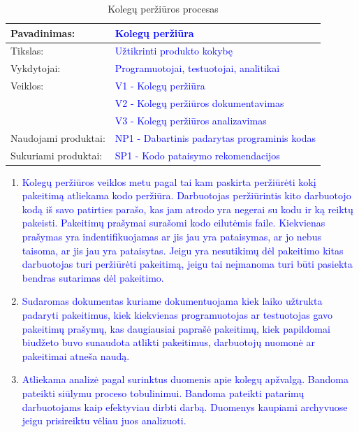 \documentclass{VUMIFPSkursinis}
\begin{document}
	\begin{center}
		\begin{table}[ht]
			\caption{Kolegų peržiūros procesas}
			\begin{tabular}{ | l | l | }
				\hline
				Pavadinimas:         & \textcolor{blue}{Kolegų peržiūra}				\\ \hline
				Tikslas:             & \textcolor{blue}{Užtikrinti produkto kokybę}			\\ \hline
				Vykdytojai:          & \textcolor{blue}{Programuotojai, testuotojai, analitikai}			\\ \hline
				Veiklos:             & \textcolor{blue}{V1 - Kolegų peržiūra}	\\
							& \textcolor{blue}{V2 - Kolegų peržiūros dokumentavimas}	\\ 
							& \textcolor{blue}{V3 - Kolegų peržiūros analizavimas} \\ \hline
				Naudojami produktai: & \textcolor{blue}{NP1 - Dabartinis padarytas programinis kodas}	\\ \hline
				Sukuriami produktai: & \textcolor{blue}{SP1 - Kodo pataisymo rekomendacijos}	\\ \hline
			\end{tabular}
		\end{table}
	\end{center}
		\begin{enumerate}
			\item{\textcolor{blue}{Kolegų peržiūros veiklos metu pagal tai kam paskirta peržiūrėti kokį pakeitimą atliekama kodo peržiūra. 
				Darbuotojas peržiūrintis kito darbuotojo kodą iš savo patirties parašo, kas jam atrodo yra negerai su kodu ir ką reiktų pakeisti.
				Pakeitimų prašymai surašomi kodo eilutėmis faile.
				Kiekvienas prašymas yra indentifikuojamas ar jis jau yra pataisymas, ar jo nebus taisoma, ar jis jau yra pataisytas.
				Jeigu yra nesutikimų dėl pakeitimo kitas darbuotojas turi peržiūrėti pakeitimą, jeigu tai neįmanoma turi būti pasiekta bendras sutarimas dėl pakeitimo.}}
			\item{\textcolor{blue}{Sudaromas dokumentas kuriame dokumentuojama kiek laiko užtrukta padaryti pakeitimus, kiek kiekvienas programuotojas ar testuotojas gavo pakeitimų prašymų, kas daugiausiai paprašė pakeitimų, kiek papildomai biudžeto buvo sunaudota atlikti pakeitimus, darbuotojų nuomonė ar pakeitimai atneša naudą.}}
			\item{\textcolor{blue}{Atliekama analizė pagal surinktus duomenis apie kolegų apžvalgą.
				Bandoma pateikti siūlymu proceso tobulinimui.
				Bandoma pateikti patarimų darbuotojams kaip efektyviau dirbti darbą.
				Duomenys kaupiami archyvuose jeigu prisireiktu vėliau juos analizuoti.}}
		\end{enumerate}
		
\end{document}
